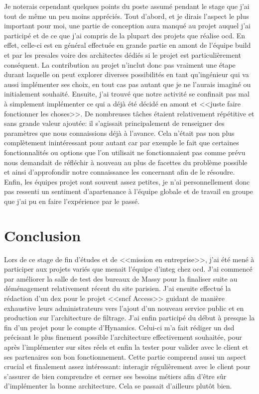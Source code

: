 \documentclass[12pt, oneside, a4paper, titlepage]{report}
\begin{document}
Je noterais cependant quelques points du poste assumé pendant le stage que j'ai
tout de même un peu moins appréciés. Tout d'abord, et je dirais l'aspect le plus
important pour moi, une partie de conception aura manqué au projet auquel j'ai
participé et de ce que j'ai compris de la plupart des projets que réalise
\gls{ocd}. En effet, celle-ci est en général effectuée en grande partie en amont
de l'équipe \gls{build} et par les \gls{presales} voire des architectes dédiés
si le projet est particulièrement conséquent. La contribution au projet n'inclut
donc pas vraiment une étape durant laquelle on peut explorer diverses
possibilités en tant qu'ingénieur qui va aussi implémenter ses choix, en tout
cas pas autant que je ne l'aurais imaginé ou initialement souhaité. Ensuite,
j'ai trouvé que notre activité se confinait pas mal à simplement implémenter ce
qui a déjà été décidé en amont et <<juste faire fonctionner les choses>>. De
nombreuses tâches étaient relativement répétitive et sans grande valeur ajoutée:
il s'agissait principalement de renseigner des paramètres que nous connaissions
déjà à l'avance. Cela n'était pas non plus complètement inintéressant pour
autant car par exemple le fait que certaines fonctionnalités ou options que l'on
utilisait ne fonctionnaient pas comme prévu nous demandait de réfléchir à
nouveau au plus de facettes du problème possible et ainsi d'approfondir notre
connaissance les concernant afin de le résoudre. Enfin, les équipes projet sont
souvent assez petites, je n'ai personnellement donc pas ressenti un sentiment
d'apartenance à l'équipe globale et de travail en groupe que j'ai pu en faire
l'expérience par le passé.


\chapter{Conclusion}%
\label{cha:conclu}

Lors de ce stage de fin d'études et de <<mission en entreprise>>, j'ai été mené
à participer aux projets variés que menait l'équipe d'\gls{integ} chez
\acrlong{ocd}. J'ai commencé par améliorer la salle de test des bureaux de Massy
pour la finaliser suite au déménagement relativement récent du site parisien.
J'ai ensuite effectué la rédaction d'un \acrfull{dex} pour le projet
<<\gls{sncf} Access>> guidant de manière exhaustive leurs administrateurs vers
l'ajout d'un nouveau service public et en production sur l'architecture de
filtrage. J'ai enfin participé du début à presque la fin d'un projet pour le
compte d'Hynamics. Celui-ci m'a fait rédiger un \acrfull{dsd} précisant le plus
finement possible l'architecture effectivement souhaitée, pour après
l'implémenter sur sites réels et enfin la tester pour valider avec le client et
ses partenaires son bon fonctionnement. Cette partie comprend aussi un aspect
crucial et finalement assez intéressant: interagir régulièrement avec le client
pour s'assurer de bien comprendre et cerner ses besoins métiers afin d'être sûr
d'implémenter la bonne architecture. Cela se passait d'ailleurs plutôt bien.
\end{document}
